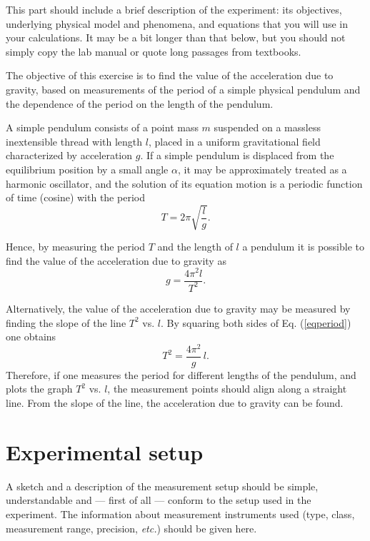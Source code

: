 \documentclass{article}
\begin{document}
{\color{blue}This part should include a brief description of the experiment: its objectives, underlying physical model and phenomena, and equations that you will use in your calculations.  It may be a bit longer than that below, but you should not simply copy the lab manual or quote long passages from textbooks.}
\vspace*{1.5em}

The objective of this exercise is to find the value of the acceleration due to gravity, based on measurements of the period of a simple physical pendulum and the dependence of the period on the length of the pendulum.

A simple pendulum consists of a point mass $m$ suspended on a massless inextensible thread with length $l$, placed in a uniform gravitational field characterized by acceleration $g$.  If a simple pendulum is displaced from the equilibrium position by a small angle $\alpha$, it may be approximately treated as a harmonic oscillator, and 
the solution of its equation motion is a periodic function of time (cosine) with the period 
\begin{equation}\label{eqperiod}
T=2\pi\sqrt{\frac{l}{g}}.
\end{equation}

Hence, by measuring the period $T$ and the length of $l$ a pendulum it is possible to find the value of the acceleration due to gravity as
\begin{equation}\label{grav}
g = \frac{4\pi^2l}{T^2}.
\end{equation}

Alternatively, the value of the acceleration due to gravity may be measured by finding the slope of the line $T^2$ vs. $l$. By squaring both sides of Eq. (\ref{eqperiod}) one obtains
\begin{equation}\label{lin}
T^2 = \frac{4\pi^2}{g}\,l.
\end{equation}
Therefore, if one measures the period for different lengths of the pendulum, and plots the graph $T^2$ vs. $l$, the measurement points should align along a straight line. From the slope of the line, the acceleration due to gravity can be found. 

\section{Experimental setup}
{\color{blue}A sketch and a description of the measurement setup should be simple, understandable and --- first of all --- conform to the setup used in the experiment. The information about measurement instruments used (type, class, measurement range, precision, \textit{etc.}) should be given here.}
\vspace*{1.5em}
\end{document}
